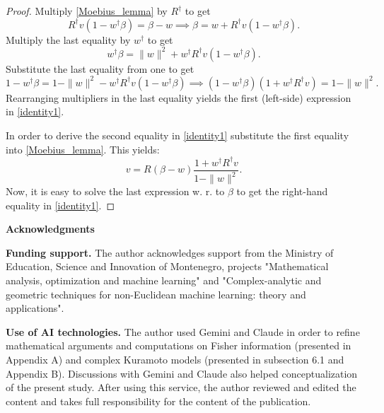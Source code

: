\documentclass{article}
\theoremstyle{plain}%
\theoremstyle{definition}
\theoremstyle{remark}
\theoremstyle{prop}
\begin{document}
\begin{appendices}
\begin{proof}
Multiply \eqref{Moebius_lemma} by $R^\dagger$ to get
\begin{equation}
\label{expr_lemma}
R^\dagger v (1 - w^\dagger \beta) = \beta - w \implies \beta = w + R^\dagger v (1 - w^\dagger \beta).
\end{equation}
Multiply the last equality by $w^\dagger$ to get
$$
w^\dagger \beta = \| w \|^2 + w^\dagger R^\dagger v (1 - w^\dagger \beta).
$$
Substitute the last equality from one to get
$$
1 - w^\dagger \beta = 1 - \|w\|^2 - w^\dagger R^\dagger v (1 - w^\dagger \beta) \implies (1 - w^\dagger \beta) (1 + w^\dagger R^\dagger v) = 1 - \|w\|^2.
$$
Rearranging multipliers in the last equality yields the first (left-side) expression in \eqref{identity1}.

In order to derive the second equality in \eqref{identity1} substitute the first equality into \eqref{Moebius_lemma}. This yields:
$$
v = R (\beta - w) \frac{1 + w^\dagger R^\dagger v}{1 - \| w \|^2}.
$$
Now, it is easy to solve the last expression w. r. to $\beta$ to get the right-hand equality in \eqref{identity1}.

\end{proof}

{\bf Acknowledgments}

\medskip

{\bf Funding support.}
The author acknowledges support from the Ministry of Education, Science and Innovation of Montenegro, projects "Mathematical analysis, optimization and machine learning" and "Complex-analytic and geometric techniques for non-Euclidean machine learning: theory and applications".


{\bf Use of AI technologies.}
The author used Gemini and Claude in order to refine mathematical arguments and computations on Fisher information (presented in Appendix A) and complex Kuramoto models (presented in subsection 6.1 and Appendix B). Discussions with Gemini and Claude also helped conceptualization of the present study. After using this service, the author reviewed and edited the content and takes full responsibility for the content of the publication.

\end{appendices}
\end{document}
